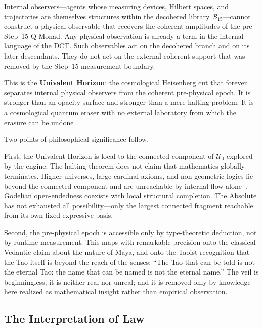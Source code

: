 \documentclass[12pt,a4paper]{article}
\begin{document}
Internal observers---agents whose measuring devices, Hilbert spaces, and trajectories are themselves structures within the decohered library $\mathcal{B}_{15}$---cannot construct a physical observable that recovers the coherent amplitudes of the pre-Step~15 Q-Monad. Any physical observation is already a term in the internal language of the DCT. Such observables act on the decohered branch and on its later descendants. They do not act on the external coherent support that was removed by the Step~15 measurement boundary.

This is the \textbf{Univalent Horizon}: the cosmological Heisenberg cut that forever separates internal physical observers from the coherent pre-physical epoch. It is stronger than an opacity surface and stronger than a mere halting problem. It is a cosmological quantum eraser with no external laboratory from which the erasure can be undone~\cite{pen2}.

Two points of philosophical significance follow.

First, the Univalent Horizon is local to the connected component of $\mathcal{U}_0$ explored by the engine. The halting theorem does not claim that mathematics globally terminates. Higher universes, large-cardinal axioms, and non-geometric logics lie beyond the connected component and are unreachable by internal flow alone~\cite{pen1}. G\"odelian open-endedness coexists with local structural completion. The Absolute has not exhausted all possibility---only the largest connected fragment reachable from its own fixed expressive basis.

Second, the pre-physical epoch is accessible only by type-theoretic deduction, not by runtime measurement. This maps with remarkable precision onto the classical Vedantic claim about the nature of Maya, and onto the Taoist recognition that the Tao itself is beyond the reach of the senses: ``The Tao that can be told is not the eternal Tao; the name that can be named is not the eternal name.'' The veil is beginningless; it is neither real nor unreal; and it is removed only by knowledge---here realized as mathematical insight rather than empirical observation.


\subsection{The Interpretation of Law}
\label{sec:law}
\end{document}
